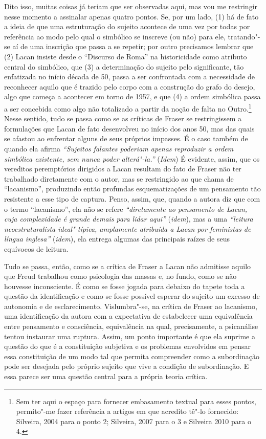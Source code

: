 Dito isso, muitas coisas já teriam que ser observadas aqui, mas vou me
restringir nesse momento a assinalar apenas quatro pontos. Se, por um
lado, (1) há de fato a ideia de que uma estruturação do sujeito acontece
de uma vez por todas por referência ao modo pelo qual o simbólico se
inscreve (ou não) para ele, tratando"-se aí de uma inscrição que passa a
se repetir; por outro precisamos lembrar que (2) Lacan insiste desde o
``Discurso de Roma'' na historicidade como atributo central do
simbólico, que (3) a determinação do sujeito pelo significante, tão
enfatizada no início década de 50, passa a ser confrontada com a
necessidade de reconhecer aquilo que é trazido pelo corpo com a
construção do grafo do desejo, algo que começa a acontecer em torno de
1957, e que (4) a ordem simbólica passa a ser concebida como algo não
totalizado a partir da noção de falta no Outro.\footnote{Sem ter aqui o
  espaço para fornecer embasamento textual para esses pontos, permito"-me
  fazer referência a artigos em que acredito tê"-lo fornecido: Silveira,
  2004 para o ponto 2; Silveira, 2007 para o 3 e Silveira 2010 para o 4.}
Nesse sentido, tudo se passa como se as críticas de Fraser se
restringissem a formulações que Lacan de fato desenvolveu no início dos
anos 50, mas das quais se afastou ao enfrentar alguns de seus próprios
impasses. É o caso também de quando ela afirma \emph{``Sujeitos falantes
poderiam apenas reproduzir a ordem simbólica existente, sem nunca poder
alterá"-la.''} (\emph{Idem}) É evidente, assim, que os vereditos
peremptórios dirigidos a Lacan resultam do fato de Fraser não ter
trabalhado diretamente com o autor, mas se restringido ao que chama de
``lacanismo'', produzindo então profundas esquematizações de um
pensamento tão resistente a esse tipo de captura. Penso, assim, que,
quando a autora diz que com o termo ``lacanismo'', ela não se refere
\emph{``diretamente ao pensamento de Lacan, cuja complexidade é grande
demais para lidar aqui''} (\emph{idem}), mas a uma \emph{``leitura
neoestruturalista ideal"-típica, amplamente atribuída a Lacan por
feministas de língua inglesa''} (\emph{idem}), ela entrega algumas das
principais raízes de seus equívocos de leitura.

Tudo se passa, então, como se a crítica de Fraser a Lacan não admitisse
aquilo que Freud trabalhou como psicologia das massas e, no fundo, como
se não houvesse inconsciente. É como se fosse jogada para debaixo do
tapete toda a questão da identificação e como se fosse possível esperar
do sujeito um excesso de autonomia e de esclarecimento. Vislumbra"-se, na
crítica de Fraser ao lacanismo, uma identificação da autora com a
expectativa de estabelecer uma equivalência entre pensamento e
consciência, equivalência na qual, precisamente, a psicanálise tentou
instaurar uma ruptura. Assim, um ponto importante é que ela suprime a
questão do que é a constituição subjetiva e os problemas envolvidos em
pensar essa constituição de um modo tal que permita compreender como a
subordinação pode ser desejada pelo próprio sujeito que vive a condição
de subordinação. E essa parece ser uma questão central para a própria
teoria crítica.

